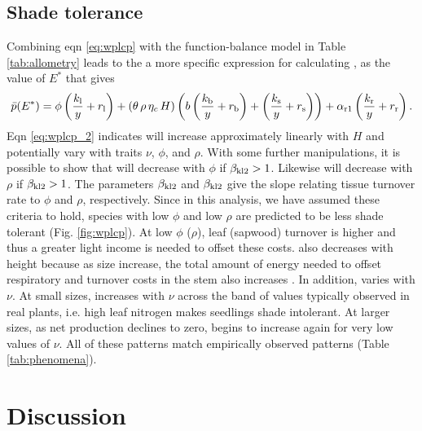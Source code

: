 \documentclass[a4paper,11pt]{article}
\begin{document}
\subsection{Shade tolerance}
Combining eqn \ref{eq:wplcp} with the function-balance model in Table \ref{tab:allometry} leads to the a more specific expression for calculating {\wplcp}, as the value of $E^*$ that gives
\begin{equation}\label{eq:wplcp_2}
\bar{p}(E^*) =
      \phi \left(\frac{k_{\rm l}}{y} + r_{\rm l}\right) +
      \left(\theta \, \rho \, \eta_c \, H\right)
        \left(b\left(\frac{k_{\rm b}}{y} + r_{\rm b}\right)
            + \left(\frac{k_{\rm s}}{y} + r_{\rm s}\right)\right) +
      \alpha_{\rm r1} \left(\frac{k_{\rm r}}{y} + r_{\rm r}\right).
\end{equation}
Eqn \ref{eq:wplcp_2} indicates {\wplcp} will increase approximately linearly with $H$ and potentially vary with traits $\nu$, $\phi$, and $\rho$. With some further manipulations, it is possible to show that {\wplcp} will decrease with $\phi$ if $\beta_{{\rm kl2}} >1$. Likewise {\wplcp} will decrease with $\rho$ if $\beta_{{\rm kl2}} >1$. The parameters $\beta_{{\rm kl2}}$ and $\beta_{{\rm kl2}}$ give the slope relating tissue turnover rate to $\phi$ and $\rho$, respectively. Since in this analysis, we have assumed these criteria to hold, species with low $\phi$ and low $\rho$ are predicted to be less shade tolerant (Fig. \ref{fig:wplcp}). At low $\phi$ ($\rho$), leaf (sapwood) turnover is higher and thus a greater light income is needed to offset these costs. {\wplcp} also decreases with height because as size increase, the total amount of energy needed to offset respiratory and turnover costs in the stem also increases \citep{Givnish-1988}. In addition, {\wplcp} varies with $\nu$. At small sizes, {\wplcp} increases with $\nu$ across the band of values typically observed in real plants, i.e. high leaf nitrogen makes seedlings shade intolerant. At larger sizes, as net production declines to zero, {\wplcp} begins to increase again for very low values of $\nu$. All of these patterns match empirically observed patterns (Table \ref{tab:phenomena}).

\section{Discussion}
\end{document}
